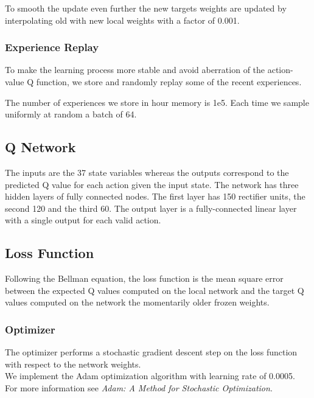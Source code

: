 \documentclass[pagenumber=off]{article}
\begin{document}
To smooth the update even further the new targets weights are updated by interpolating old with new local weights with a factor of 0.001.

\subsubsection{Experience Replay}

To make the learning process more stable and avoid aberration of the action-value Q function, we store and randomly replay some of the recent experiences.

The number of experiences we store in hour memory is 1e5. Each time we sample uniformly at random a batch of 64.


\subsection{Q Network}

The inputs are the 37 state variables whereas the outputs correspond to the predicted Q value for each action given the input state.
The network has three hidden layers of fully connected nodes. The first layer has 150 rectifier units, the second 120 and the third 60. The output layer is a fully-connected linear layer with a single output for each valid action. 



\subsection{Loss Function}

Following the Bellman equation, the loss function is the mean square error between the expected Q values computed on the local network and the target Q values computed on the network the momentarily older frozen weights.  

\subsubsection{Optimizer}

The optimizer performs a stochastic gradient descent step on the loss function with respect to the network weights.\\
We implement the Adam optimization algorithm with learning rate of 0.0005.\\
For more information see {\it Adam: A Method for Stochastic Optimization}.



\end{document}
